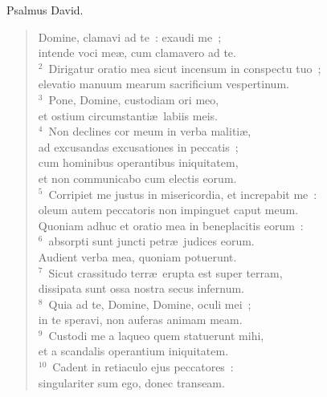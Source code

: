\bchapter
\lettrine[lines=3,image=true,loversize=0.05,lraise=-0.03]{P}{}salmus David. \begin{flushleft}\begin{verse}\vspace{6pt}Domine, clamavi ad te~: exaudi me~;\\ intende voci me\ae , cum clamavero ad te.\\
${}^{2}$~Dirigatur oratio mea sicut incensum in conspectu tuo~;\\ elevatio manuum mearum sacrificium vespertinum.\\
${}^{3}$~Pone, Domine, custodiam ori meo,\\ et ostium circumstanti\ae\ labiis meis.\\
${}^{4}$~Non declines cor meum in verba maliti\ae ,\\ ad excusandas excusationes in peccatis~;\\ cum hominibus operantibus iniquitatem,\\ et non communicabo cum electis eorum.\\
${}^{5}$~Corripiet me justus in misericordia, et increpabit me~:\\ oleum autem peccatoris non impinguet caput meum.\\ Quoniam adhuc et oratio mea in beneplacitis eorum~:\\
${}^{6}$~absorpti sunt juncti petr\ae\ judices eorum.\\ Audient verba mea, quoniam potuerunt.\\
${}^{7}$~Sicut crassitudo terr\ae\ erupta est super terram,\\ dissipata sunt ossa nostra secus infernum.\\
${}^{8}$~Quia ad te, Domine, Domine, oculi mei~;\\ in te speravi, non auferas animam meam.\\
${}^{9}$~Custodi me a laqueo quem statuerunt mihi,\\ et a scandalis operantium iniquitatem.\\
${}^{10}$~Cadent in retiaculo ejus peccatores~:\\ singulariter sum ego, donec transeam.\end{verse}\end{flushleft}



